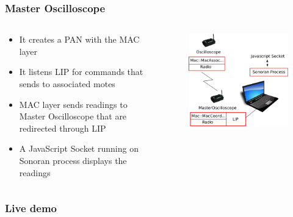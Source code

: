 \begin{frame}[fragile]
 \frametitle{Master Oscilloscope}
 \begin{columns}
    \begin{column}{.58\linewidth}
      \begin{itemize}
	\item It creates a PAN with the MAC layer
	\item It listens LIP for commands that sends to associated motes
	\item MAC layer sends readings to Master Oscilloscope that are redirected through LIP 
	\item A JavaScript Socket running on Sonoran process displays the readings
      \end{itemize}
  \end{column}
  \hfill
    \begin{column}{.4\linewidth}
      \begin{figure}
	\includegraphics[width=\textwidth]{img/oscilloscope.png}
      \end{figure}
    \end{column}
  \end{columns}
\end{frame}



\begin{frame}[fragile]
\frametitle{Live demo}
\end{frame}